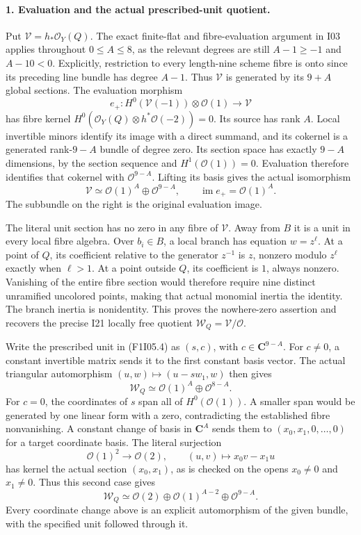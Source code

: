 \paragraph{1. Evaluation and the actual prescribed-unit quotient.}
Put $\mathcal V=h_*\mathcal O_Y(Q)$.
The exact finite-flat and fibre-evaluation argument in I03 applies
throughout $0\le A\le8$, as the relevant degrees are still
$A-1\ge-1$ and $A-10<0$. Explicitly, restriction to every
length-nine scheme fibre is onto since its preceding line bundle
has degree $A-1$. Thus $\mathcal V$ is generated by its
$9+A$ global sections. The evaluation morphism
\[
 e_+:H^0(\mathcal V(-1))\otimes\mathcal O(1)
                 \longrightarrow\mathcal V
\]
has fibre kernel $H^0(\mathcal O_Y(Q)\otimes h^*\mathcal O(-2))=0$.
Its source has rank $A$. Local invertible minors identify its
image with a direct summand, and its cokernel is a generated
rank-$9-A$ bundle of degree zero. Its section space has exactly
$9-A$ dimensions, by the section sequence and
$H^1(\mathcal O(1))=0$. Evaluation therefore identifies that
cokernel with $\mathcal O^{9-A}$. Lifting its basis gives
the actual isomorphism
\[
 \mathcal V\simeq\mathcal O(1)^A\oplus\mathcal O^{9-A},
 \qquad \operatorname{im}e_+=\mathcal O(1)^A.
 \tag{F1I05.4}
\]
The subbundle on the right is the original evaluation image.

The literal unit section has no zero in any fibre of $\mathcal V$.
Away from $B$ it is a unit in every local fibre algebra. Over
$b_i\in B$, a local branch has equation $w=z^\ell$. At a
point of $Q$, its coefficient relative to the generator $z^{-1}$
is $z$, nonzero modulo $z^\ell$ exactly when $\ell>1$.
At a point outside $Q$, its coefficient is $1$, always nonzero.
Vanishing of the entire fibre section would therefore require
nine distinct unramified uncolored points, making that actual
monomial inertia the identity. The branch inertia is nonidentity.
This proves the nowhere-zero assertion and recovers the precise
I21 locally free quotient $\mathcal W_Q=\mathcal V/\mathcal O$.

Write the prescribed unit in (F1I05.4) as $(s,c)$, with
$c\in\mathbf C^{9-A}$. For $c\ne0$, a constant invertible
matrix sends it to the first constant basis vector. The actual
triangular automorphism $(u,w)\mapsto(u-sw_1,w)$ then gives
\[
 \mathcal W_Q\simeq\mathcal O(1)^A\oplus\mathcal O^{8-A}.
 \tag{F1I05.5}
\]
For $c=0$, the coordinates of $s$ span all of
$H^0(\mathcal O(1))$. A smaller span would be generated by one
linear form with a zero, contradicting the established fibre
nonvanishing. A constant change of basis in $\mathbf C^A$
sends them to $(x_0,x_1,0,\ldots,0)$ for a target coordinate
basis. The literal surjection
\[
 \mathcal O(1)^2\longrightarrow\mathcal O(2),
             \qquad(u,v)\longmapsto x_0v-x_1u
\]
has kernel the actual section $(x_0,x_1)$, as is checked on
the opens $x_0\ne0$ and $x_1\ne0$. Thus this second case gives
\[
 \mathcal W_Q\simeq\mathcal O(2)\oplus
           \mathcal O(1)^{A-2}\oplus\mathcal O^{9-A}.
 \tag{F1I05.6}
\]
Every coordinate change above is an explicit automorphism of
the given bundle, with the specified unit followed through it.

